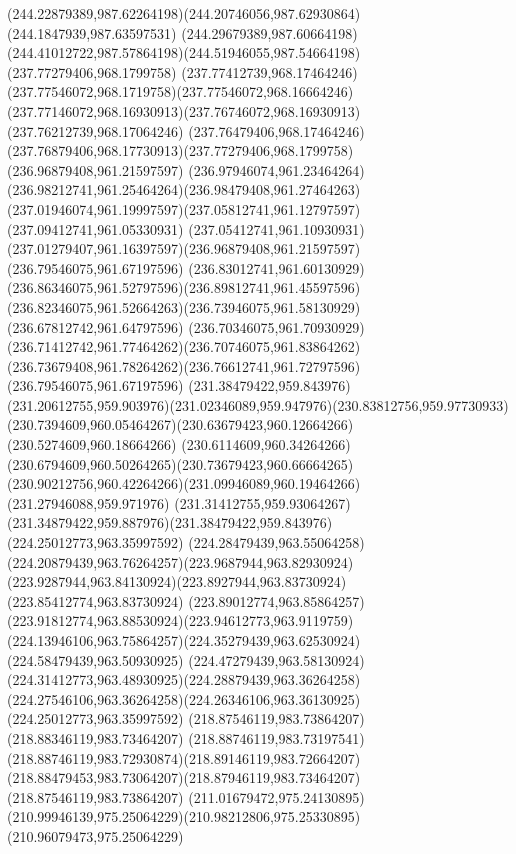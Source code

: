 {{  \curveto(244.22879389,987.62264198)(244.20746056,987.62930864)(244.1847939,987.63597531)
  \curveto(244.29679389,987.60664198)(244.41012722,987.57864198)(244.51946055,987.54664198)
  \moveto(237.77279406,968.1799758)
  \curveto(237.77412739,968.17464246)(237.77546072,968.1719758)(237.77546072,968.16664246)
  \curveto(237.77146072,968.16930913)(237.76746072,968.16930913)(237.76212739,968.17064246)
  \curveto(237.76479406,968.17464246)(237.76879406,968.17730913)(237.77279406,968.1799758)
  \moveto(236.96879408,961.21597597)
  \curveto(236.97946074,961.23464264)(236.98212741,961.25464264)(236.98479408,961.27464263)
  \curveto(237.01946074,961.19997597)(237.05812741,961.12797597)(237.09412741,961.05330931)
  \curveto(237.05412741,961.10930931)(237.01279407,961.16397597)(236.96879408,961.21597597)
  \moveto(236.79546075,961.67197596)
  \curveto(236.83012741,961.60130929)(236.86346075,961.52797596)(236.89812741,961.45597596)
  \curveto(236.82346075,961.52664263)(236.73946075,961.58130929)(236.67812742,961.64797596)
  \curveto(236.70346075,961.70930929)(236.71412742,961.77464262)(236.70746075,961.83864262)
  \curveto(236.73679408,961.78264262)(236.76612741,961.72797596)(236.79546075,961.67197596)
  \moveto(231.38479422,959.843976)
  \curveto(231.20612755,959.903976)(231.02346089,959.947976)(230.83812756,959.97730933)
  \curveto(230.7394609,960.05464267)(230.63679423,960.12664266)(230.5274609,960.18664266)
  \curveto(230.6114609,960.34264266)(230.6794609,960.50264265)(230.73679423,960.66664265)
  \curveto(230.90212756,960.42264266)(231.09946089,960.19464266)(231.27946088,959.971976)
  \curveto(231.31412755,959.93064267)(231.34879422,959.887976)(231.38479422,959.843976)
  \moveto(224.25012773,963.35997592)
  \curveto(224.28479439,963.55064258)(224.20879439,963.76264257)(223.9687944,963.82930924)
  \curveto(223.9287944,963.84130924)(223.8927944,963.83730924)(223.85412774,963.83730924)
  \curveto(223.89012774,963.85864257)(223.91812774,963.88530924)(223.94612773,963.9119759)
  \curveto(224.13946106,963.75864257)(224.35279439,963.62530924)(224.58479439,963.50930925)
  \curveto(224.47279439,963.58130924)(224.31412773,963.48930925)(224.28879439,963.36264258)
  \curveto(224.27546106,963.36264258)(224.26346106,963.36130925)(224.25012773,963.35997592)
  \moveto(218.87546119,983.73864207)
  \lineto(218.88346119,983.73464207)
  \curveto(218.88746119,983.73197541)(218.88746119,983.72930874)(218.89146119,983.72664207)
  \curveto(218.88479453,983.73064207)(218.87946119,983.73464207)(218.87546119,983.73864207)
  \moveto(211.01679472,975.24130895)
  \curveto(210.99946139,975.25064229)(210.98212806,975.25330895)(210.96079473,975.25064229)
}}
